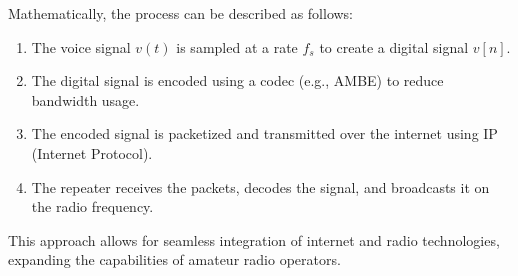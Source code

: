 Mathematically, the process can be described as follows:
\begin{enumerate}
    \item The voice signal \( v(t) \) is sampled at a rate \( f_s \) to create a digital signal \( v[n] \).
    \item The digital signal is encoded using a codec (e.g., AMBE) to reduce bandwidth usage.
    \item The encoded signal is packetized and transmitted over the internet using IP (Internet Protocol).
    \item The repeater receives the packets, decodes the signal, and broadcasts it on the radio frequency.
\end{enumerate}

This approach allows for seamless integration of internet and radio technologies, expanding the capabilities of amateur radio operators.

